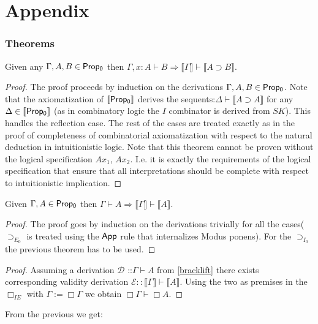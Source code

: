 					
					\appendix
					
					\label{appen}
\chapter{Appendix}
\subsection{Theorems}
					
					\begin{theorem}
						\label{deduct}
						Given any  $\Gamma,A,B \in {\sf Prop_0}$ then $\Gamma,x:A\vdash B \Longrightarrow \llbracket\Gamma\rrbracket\vdash\llbracket   A\supset B\rrbracket$. 
					\end{theorem}
					\begin{proof}
						The proof proceeds by induction on the derivations $\Gamma,A,B \in {\sf Prop_0}$. Note that the axiomatization of ${\llbracket\sf Prop_0\rrbracket}$ derives the 
						sequents:$\Delta\vdash\llbracket A \supset A\rrbracket$
						for any $\Delta\in {\sf \llbracket Prop_0 \rrbracket}$ (as in combinatory logic the $I$ combinator is derived from $SK$). This handles the reflection case. The rest of the cases are treated exactly as in the proof 
						of completeness of combinatorial axiomatization with respect to the natural deduction in intuitionistic logic. 
						Note that this theorem cannot be proven without the logical specification {\sf $Ax_1$, $Ax_2$}. I.e. it is exactly the requirements of the logical specification that ensure that all  interpretations  
						should be complete with respect to intuitionistic implication.
					\end{proof}
					\begin{lemma}
						\label{bracklift}
						Given  $\Gamma,  A \in {\sf Prop_0}$ then $\Gamma\vdash   A \Longrightarrow \llbracket \Gamma\rrbracket \vdash \llbracket   A \rrbracket$. 
					\end{lemma}
					
					\begin{proof}
						The proof goes by induction on the derivations trivially for all the cases($\supset_{E_0}$ is treated using the ${\sf App}$ rule that internalizes Modus ponens). For the $\supset_{I_0}$ the previous theorem has to be used.
					\end{proof}

					\begin{proof}
						Assuming a derivation $\mathcal {D}$ ::$\Gamma\vdash   A$ from \ref{bracklift} there exists corresponding validity derivation $\mathcal{E}::\llbracket\Gamma\rrbracket\vdash\llbracket   A \rrbracket$. Using the two as premises in the $\Box_{IE}$ with $\Gamma := \Box \Gamma$ we obtain $\Box\Gamma\vdash\Box   A$.
					\end{proof}
					From the previous we get:

